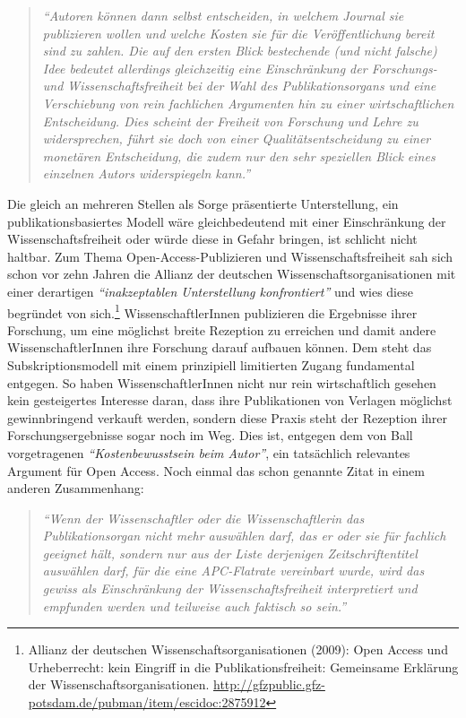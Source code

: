 \documentclass[a4paper,
fontsize=11pt,
oneside,
numbers=noperiodatend,
parskip=half-,
bibliography=totoc,
final
]{scrartcl}
\begin{document}
\begin{quote}
\emph{\enquote{Autoren können dann selbst entscheiden, in welchem
Journal sie publizieren wollen und welche Kosten sie für die
Veröffentlichung bereit sind zu zahlen. Die auf den ersten Blick
bestechende (und nicht falsche) Idee bedeutet allerdings gleichzeitig
eine Einschränkung der Forschungs- und Wissenschaftsfreiheit bei der
Wahl des Publikationsorgans und eine Verschiebung von rein fachlichen
Argumenten hin zu einer wirtschaftlichen Entscheidung. Dies scheint der
Freiheit von Forschung und Lehre zu widersprechen, führt sie doch von
einer Qualitätsentscheidung zu einer monetären Entscheidung, die zudem
nur den sehr speziellen Blick eines einzelnen Autors widerspiegeln
kann.}}
\end{quote}

Die gleich an mehreren Stellen als Sorge präsentierte Unterstellung, ein
publikationsbasiertes Modell wäre gleichbedeutend mit einer
Einschränkung der Wissenschaftsfreiheit oder würde diese in Gefahr
bringen, ist schlicht nicht haltbar. Zum Thema Open-Access-Publizieren
und Wissenschaftsfreiheit sah sich schon vor zehn Jahren die Allianz der
deutschen Wissenschaftsorganisationen mit einer derartigen
\emph{\enquote{inakzeptablen Unterstellung konfrontiert}} und wies diese
begründet von sich.\footnote{Allianz der deutschen
  Wissenschaftsorganisationen (2009): Open Access und Urheberrecht: kein
  Eingriff in die Publikationsfreiheit: Gemeinsame Erklärung der
  Wissenschaftsorganisationen.
  \url{http://gfzpublic.gfz-potsdam.de/pubman/item/escidoc:2875912}}
WissenschaftlerInnen publizieren die Ergebnisse ihrer Forschung, um eine
möglichst breite Rezeption zu erreichen und damit andere
WissenschaftlerInnen ihre Forschung darauf aufbauen können. Dem steht
das Subskriptionsmodell mit einem prinzipiell limitierten Zugang
fundamental entgegen. So haben WissenschaftlerInnen nicht nur rein
wirtschaftlich gesehen kein gesteigertes Interesse daran, dass ihre
Publikationen von Verlagen möglichst gewinnbringend verkauft werden,
sondern diese Praxis steht der Rezeption ihrer Forschungsergebnisse
sogar noch im Weg. Dies ist, entgegen dem von Ball vorgetragenen
\emph{\enquote{Kostenbewusstsein beim Autor}}, ein tatsächlich
relevantes Argument für Open Access. Noch einmal das schon genannte
Zitat in einem anderen Zusammenhang:

\begin{quote}
\emph{\enquote{Wenn der Wissenschaftler oder die Wissenschaftlerin das
Publikationsorgan nicht mehr auswählen darf, das er oder sie für
fachlich geeignet hält, sondern nur aus der Liste derjenigen
Zeitschriftentitel auswählen darf, für die eine APC-Flatrate vereinbart
wurde, wird das gewiss als Einschränkung der Wissenschaftsfreiheit
interpretiert und empfunden werden und teilweise auch faktisch so
sein.}}
\end{quote}
\end{document}
